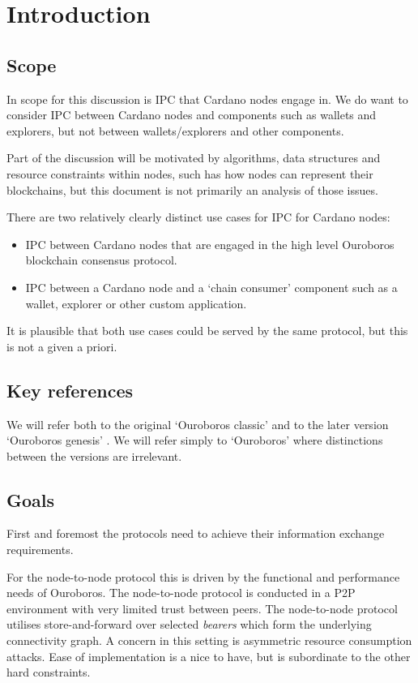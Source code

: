 \documentclass{article}
\theoremstyle{definition}{
  \newtheorem{lemma}{Lemma}[section] %
  \newtheorem{definition}[lemma]{Definition}
}
\theoremstyle{theorem}{
  \newtheorem{invariant}[lemma]{Invariant}
  \newtheorem{proofobligation}[lemma]{Proof Obligation}
}
\numberwithin{equation}{lemma}
\begin{document}
\section{Introduction}

\subsection{Scope}

In scope for this discussion is IPC that Cardano nodes engage in. We do want
to consider IPC between Cardano nodes and components such as wallets and
explorers, but not between wallets/explorers and other components.

Part of the discussion will be motivated by algorithms, data structures and
resource constraints within nodes, such has how nodes can represent their
blockchains, but this document is not primarily an analysis of those issues.

There are two relatively clearly distinct use cases for IPC for Cardano nodes:
\begin{itemize}
\item IPC between Cardano nodes that are engaged in the high level Ouroboros
      blockchain consensus protocol.
\item IPC between a Cardano node and a `chain consumer' component such as a
      wallet, explorer or other custom application.
\end{itemize}

It is plausible that both use cases could be served by the same protocol, but
this is not a given a priori.

\subsection{Key references}

We will refer both to the original `Ouroboros classic' \citep{ouroboros-classic}
and to the later version `Ouroboros genesis' \citep{ouroboros-genesis}. We will
refer simply to `Ouroboros' where distinctions between the versions are
irrelevant.

\subsection{Goals}

First and foremost the protocols need to achieve their information exchange
requirements.

For the node-to-node protocol this is driven by the functional and performance
needs of Ouroboros. The node-to-node protocol is conducted in a P2P environment
with very limited trust between peers. The node-to-node protocol utilises
store-and-forward over selected \emph{bearers} which form the underlying
connectivity graph. A concern in this setting is asymmetric resource consumption
attacks. Ease of implementation is a nice to have, but is subordinate to the
other hard constraints.
\end{document}
